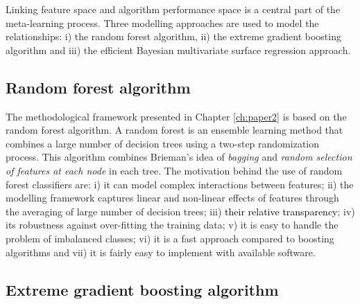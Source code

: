 \documentclass{monashthesis}
\begin{document}
Linking feature space and algorithm performance space is a central part of the meta-learning process. Three modelling approaches are used to model the relationships: i) the random forest algorithm, ii) the extreme gradient boosting algorithm and iii) the efficient Bayesian multivariate surface regression approach.

\hypertarget{random-forest-algorithm}{%
\subsection{Random forest algorithm}\label{random-forest-algorithm}}

The methodological framework presented in Chapter \ref{ch:paper2} is based on the random forest algorithm. A random forest \autocite{breiman2001random} is an ensemble learning method that combines a large number of decision trees using a two-step randomization process. This algorithm combines Brieman's idea of \emph{bagging} and \emph{random selection of features at each node} in each tree. The motivation behind the use of random forest classifiers are: i) it can model complex interactions between features; ii) the modelling framework captures linear and non-linear effects of features through the averaging of large number of decision trees; iii) \textcolor{black}{their relative transparency}; iv) its robustness against over-fitting the training data; v) it is easy to handle the problem of imbalanced classes; vi) it is a fast approach compared to boosting algorithms and vii) it is fairly easy to implement with available software.

\hypertarget{extreme-gradient-boosting-algorithm}{%
\subsection{Extreme gradient boosting algorithm}\label{extreme-gradient-boosting-algorithm}}
\end{document}
